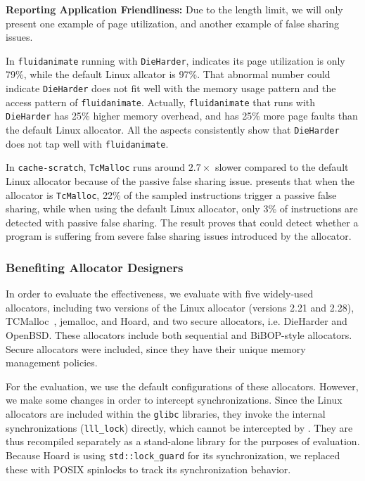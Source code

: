 \textbf{Reporting Application Friendliness:} 
Due to the length limit, we will only present one example of page utilization, and another example of false sharing issues.

In \texttt{fluidanimate} running with \texttt{DieHarder}, \MP{} indicates its page utilization is only 79\%, while the default Linux allcator is 97\%. That abnormal number could indicate \texttt{DieHarder} does not fit well with the memory usage pattern and the access pattern of \texttt{fluidanimate}. Actually, \texttt{fluidanimate} that runs with \texttt{DieHarder} has 25\% higher memory overhead, and has 25\% more page faults than the default Linux allocator. All the aspects consistently show that \texttt{DieHarder} does not tap well with \texttt{fluidanimate}.

In \texttt{cache-scratch}, \texttt{TcMalloc} runs around $2.7\times$ slower compared to the default Linux allocator because of the passive false sharing issue.
\MP{} presents that when the allocator is \texttt{TcMalloc}, 22\% of the sampled instructions trigger a passive false sharing, while when using the default Linux allocator, only 3\% of instructions are detected with passive false sharing.
The result proves that \MP{} could detect whether a program is suffering from severe false sharing issues introduced by the allocator.

\subsubsection{Benefiting Allocator Designers}
In order to evaluate the effectiveness, we evaluate \MP{} with five widely-used allocators, including two versions of the Linux allocator (versions 2.21 and 2.28), TCMalloc~\cite{tcmalloc}, jemalloc, and Hoard, and two secure allocators, i.e. DieHarder and OpenBSD. These allocators include both sequential and BiBOP-style allocators. Secure allocators were included, since they have their unique memory management policies. 

For the evaluation, we use the default configurations of these allocators. However, we make some changes in order to  intercept synchronizations. Since the Linux allocators are included within the \texttt{glibc} libraries, they invoke the internal synchronizations (\texttt{lll\_lock}) directly, which cannot be intercepted by \MP{}. They are thus recompiled separately as a stand-alone library for the purposes of evaluation. Because Hoard is using \texttt{std::lock\_guard} for its synchronization, we replaced these with POSIX spinlocks to track its synchronization behavior.

